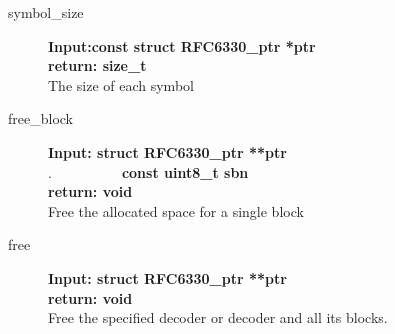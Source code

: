 \documentclass[11pt,a4paper]{refart}
\begin{document}
\begin{description}
\item[symbol\_size]\textbf{Input:const struct RFC6330\_ptr *ptr}\\
\textbf{return: size\_t}\\
The size of each symbol
\item[free\_block]\textbf{Input: struct RFC6330\_ptr **ptr}\\
.\ \ \ \ \ \ \ \ \ \ \textbf{const uint8\_t sbn}\\
\textbf{return: void}\\
Free the allocated space for a single block
\item[free]\textbf{Input: struct RFC6330\_ptr **ptr}\\
\textbf{return: void}\\
Free the specified decoder or decoder and all its blocks.
\end{description}
\end{document}

